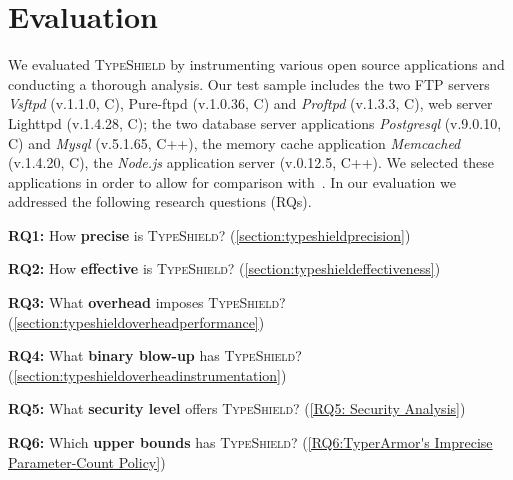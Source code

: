 \section{Evaluation}
\label{chapter:Evaluation}
We evaluated \textsc{TypeShield} by instrumenting various open source applications and conducting a thorough analysis. Our test sample includes the two 
FTP servers \textit{Vsftpd} (v.1.1.0, C), Pure-ftpd (v.1.0.36, C) and 
\textit{Proftpd} (v.1.3.3, C), 
web server Lighttpd (v.1.4.28, C); 
the two database server applications 
\textit{Postgresql} (v.9.0.10, C) and 
\textit{Mysql} (v.5.1.65, C++), 
the memory cache application 
\textit{Memcached} (v.1.4.20, C), 
the \textit{Node.js} application server (v.0.12.5, C++). 
We selected these applications in order to allow for comparison with~\cite{veen:typearmor}. 
In our evaluation we addressed the following research questions (RQs).

 \textbf{RQ1:} How \textbf{precise} is \textsc{TypeShield}? (\cref{section:typeshieldprecision})\vspace{-.05cm}

 \textbf{RQ2:} How \textbf{effective} is \textsc{TypeShield}? (\cref{section:typeshieldeffectiveness})\vspace{-.05cm}

 \textbf{RQ3:} What \textbf{overhead} imposes \textsc{TypeShield}? (\cref{section:typeshieldoverheadperformance})\vspace{-.05cm}

 \textbf{RQ4:} What \textbf{binary blow-up} has \textsc{TypeShield}? (\cref{section:typeshieldoverheadinstrumentation})\vspace{-.05cm}

 \textbf{RQ5:} What \textbf{security level} offers \textsc{TypeShield}? (\cref{RQ5: Security Analysis})\vspace{-.05cm}

 \textbf{RQ6:} Which \textbf{upper bounds} has \textsc{TypeShield}? (\cref{RQ6:TyperArmor's Imprecise Parameter-Count Policy})\vspace{-.05cm}
  
